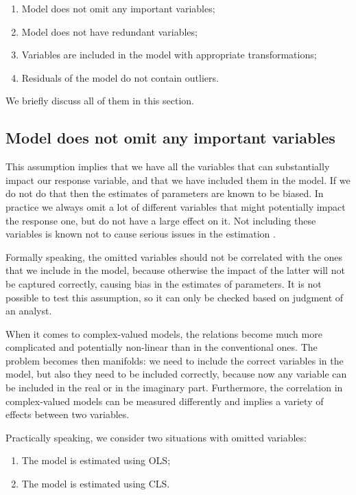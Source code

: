 \documentclass[
]{book}
\providecommand{\tightlist}{%
  \setlength{\itemsep}{0pt}\setlength{\parskip}{0pt}}
\begin{document}
\begin{enumerate}
\def\labelenumi{\arabic{enumi}.}
\tightlist
\item
  Model does not omit any important variables;
\item
  Model does not have redundant variables;
\item
  Variables are included in the model with appropriate transformations;
\item
  Residuals of the model do not contain outliers.
\end{enumerate}

We briefly discuss all of them in this section.

\hypertarget{assumptionsSpecificationOmit}{%
\subsection{Model does not omit any important variables}\label{assumptionsSpecificationOmit}}

This assumption implies that we have all the variables that can substantially impact our response variable, and that we have included them in the model. If we do not do that then the estimates of parameters are known to be biased. In practice we always omit a lot of different variables that might potentially impact the response one, but do not have a large effect on it. Not including these variables is known not to cause serious issues in the estimation \citep{Hanck2024}.

Formally speaking, the omitted variables should not be correlated with the ones that we include in the model, because otherwise the impact of the latter will not be captured correctly, causing bias in the estimates of parameters. It is not possible to test this assumption, so it can only be checked based on judgment of an analyst.

When it comes to complex-valued models, the relations become much more complicated and potentially non-linear than in the conventional ones. The problem becomes then manifolds: we need to include the correct variables in the model, but also they need to be included correctly, because now any variable can be included in the real or in the imaginary part. Furthermore, the correlation in complex-valued models can be measured differently and implies a variety of effects between two variables.

Practically speaking, we consider two situations with omitted variables:

\begin{enumerate}
\def\labelenumi{\arabic{enumi}.}
\tightlist
\item
  The model is estimated using OLS;
\item
  The model is estimated using CLS.
\end{enumerate}
\end{document}
